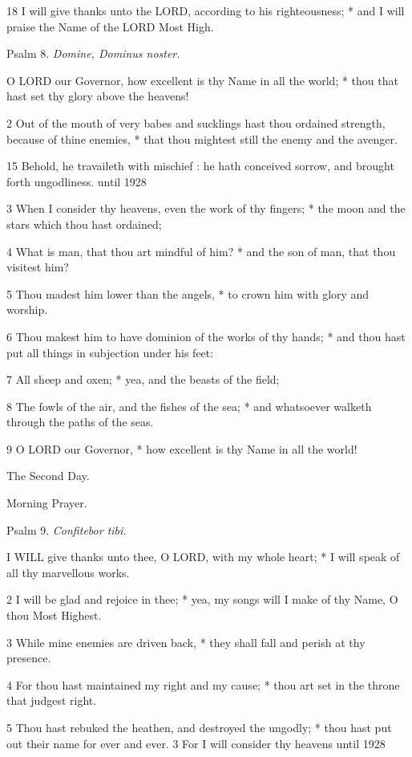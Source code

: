 18 I will give thanks unto the LORD,
according to his righteousness; * and I will praise the Name of the LORD
Most High.

Psalm
8. \emph{Domine, Dominus noster.}

O
LORD our Governor, how excellent is thy Name in all the world; * thou
that hast set thy glory above the heavens!

2 Out of the mouth of very babes and sucklings hast
thou ordained strength, because of thine enemies, * that thou mightest
still the enemy and the avenger.

15 Behold, he travaileth with
mischief : he hath conceived sorrow, and brought forth ungodliness.
until 1928

3 When I consider thy heavens, even the work of thy fingers; * the
moon and the stars which thou hast ordained;

4 What is man, that thou art mindful of him? * and the
son of man, that thou visitest him?

5 Thou madest him lower than the angels, * to crown him
with glory and worship.

6 Thou makest him to have dominion of the works of thy
hands; * and thou hast put all things in subjection under his feet:

7 All sheep and oxen; * yea, and the beasts of the field;

8 The fowls of the air, and the fishes of the sea; *
and whatsoever walketh through the paths of the seas.

9 O LORD our Governor, * how excellent
is thy Name in all the world!

The Second Day.

Morning
Prayer.

Psalm
9. \emph{Confitebor tibi.}

I
WILL give thanks unto thee, O LORD, with my whole
heart; * I will speak of all thy marvellous works.

2 I will be glad and rejoice in thee; * yea, my songs
will I make of thy Name, O thou Most Highest.

3 While mine enemies are driven back, * they shall
fall and perish at thy presence.

4 For thou hast maintained my right and my cause; *
thou art set in the throne that judgest right.

5 Thou hast rebuked the heathen, and destroyed the
ungodly; * thou hast put out their name for ever and ever. 3 For I will consider thy
heavens
until 1928

